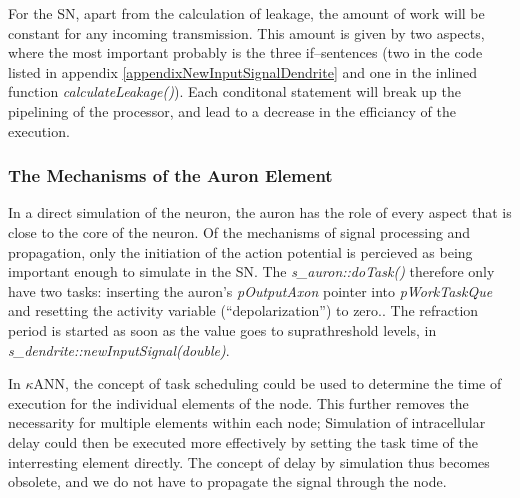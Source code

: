 		For the SN, apart from the calculation of leakage, the amount of work will be constant for any incoming transmission.
		This amount is given by two aspects, where the most important probably is the three if--sentences (two in the code listed in appendix \ref{appendixNewInputSignalDendrite} and one in the inlined function \emph{calculateLeakage()}).
		Each conditonal statement will break up the pipelining of the processor, and lead to a decrease in the efficiancy of the execution.

		\subsubsection{The Mechanisms of the Auron Element}
		In a direct simulation of the neuron, the auron has the role of every aspect that is close to the core of the neuron.
		Of the mechanisms of signal processing and propagation, only the initiation of the action potential is percieved as being important enough to simulate in the SN.
		The \emph{s\_auron::doTask()} therefore only have two tasks: inserting the auron's \emph{pOutputAxon} pointer into \emph{pWorkTaskQue} and resetting the activity variable (``depolarization'') to zero..
		The refraction period is started as soon as the value goes to suprathreshold levels, in \emph{s\_dendrite::newInputSignal(double)}. %




		In $\kappa$ANN, the concept of task scheduling could be used to determine the time of execution for the individual elements of the node.
		This further removes the necessarity for multiple elements within each node; 
			Simulation of intracellular delay could then be executed more effectively by setting the task time of the interresting element directly.
		The concept of delay by simulation thus becomes obsolete, and we do not have to propagate the signal through the node.

